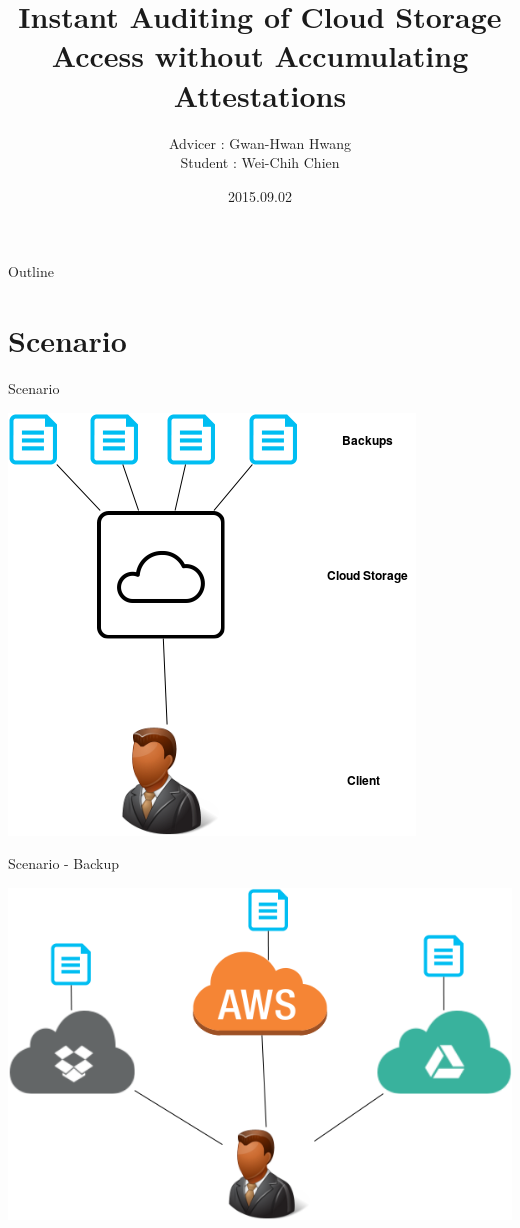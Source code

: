 \documentclass{beamer}
\title[Progress Report]{Instant Auditing of Cloud Storage Access without Accumulating Attestations}
\author[Wei-Chih Chien]{Advicer : Gwan-Hwan Hwang\\ Student : Wei-Chih Chien}
\institute[NTNU CSIE CCLAB]{NTNU CSIE CCLAB}
\date{2015.09.02}
\begin{document}
\begin{CJK}{UTF8}{bkai}
\begin{frame}
  \titlepage
\end{frame}

\begin{frame}{Outline}
  \tableofcontents
\end{frame}

\section{Scenario}
\begin{frame}{Scenario}
	\begin{center}
	\includegraphics[width=.6\textwidth]{Scenario1.png}
	\end{center}
\end{frame}

\begin{frame}{Scenario - Backup}
	\begin{center}
	\includegraphics[width=.9\textwidth]{Scenario2.png}
	\end{center}
\end{frame}


\end{CJK}
\end{document}
